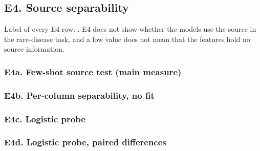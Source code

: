 \ifgen
\subsection*{E4. Source separability}
Label of every E4 row: . E4 does not show whether the models use the source in the rare-disease task, and a low value does not mean that the features hold no source information.
\fi
{}\ifgen
\subsubsection*{E4a. Few-shot source test (main measure)}

{\tiny\let\scriptsize\tiny\setlength{\tabcolsep}{2pt}}
\fi
{}\ifgen
\subsubsection*{E4b. Per-column separability, no fit}

\begin{center}\scriptsize\end{center}
\fi
{}\ifgen
\subsubsection*{E4c. Logistic probe}

\begin{center}\scriptsize\setlength{\tabcolsep}{3pt}\resizebox{\textwidth}{!}{}\end{center}
\fi
{}\ifgen
\subsubsection*{E4d. Logistic probe, paired differences}

\begin{center}\scriptsize\setlength{\tabcolsep}{3pt}\resizebox{\textwidth}{!}{}\end{center}
\fi

